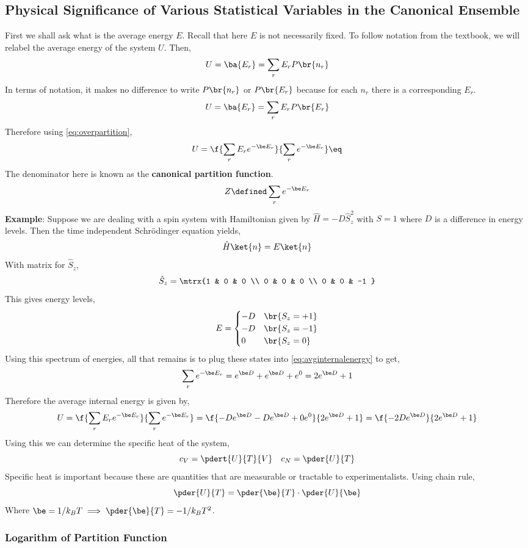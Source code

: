 \documentclass{article}
\begin{document}
\subsection{Physical Significance of Various Statistical Variables in the Canonical Ensemble}
First we shall ask what is the average energy $E$. Recall that here $E$ is not necessarily fixed. To follow notation from the textbook, we will relabel the average energy of the system $U$. Then,
\[ U = \ba{E_r} = \sum_r E_r P\br{n_r} \]
In terms of notation, it makes no difference to write $P\br{n_r}$ or $P\br{E_r}$ because for each $n_r$ there is a corresponding $E_r$.
\[ U = \ba{E_r} = \sum_r E_r P\br{E_r} \]
Therefore using \eqref{eq:overpartition},
\[ U = \f{\sum_r E_r e^{-\be E_r}}{\sum_r e^{-\be E_r}} \eq \label{eq:avginternalenergy} \]
The denominator here is known as the \textbf{canonical partition function}.
\[ Z \defined \sum_r e^{-\be E_r} \]
\textbf{Example}: Suppose we are dealing with a spin system with Hamiltonian given by $\hat{H} = - D \hat{S}_z^2$ with $S = 1$ where $D$ is a difference in energy levels. Then the time independent Schrödinger equation yields,
\[ \hat{H} \ket{n} = E \ket{n} \]
With matrix for $\hat{S}_z$,
\[ \hat{S}_z = \mtrx{1 & 0 & 0 \\ 0 & 0 & 0  \\ 0 & 0 & -1 } \]
This gives energy levels,
\[ E = \begin{cases}
    -D & \br{S_z = + 1} \\
    -D & \br{S_z = - 1} \\
    0 & \br{S_z = 0} \\
\end{cases} \]
Using this spectrum of energies, all that remains is to plug these states into \eqref{eq:avginternalenergy} to get,
\[ \sum_r e^{-\be E_r} = e^{\be D} + e^{\be D} + e^{0} = 2e^{\be D} + 1 \]
Therefore the average internal energy is given by,
\[ U = \f{\sum_r E_r e^{-\be E_r}}{\sum_r e^{-\be E_r}} = \f{-De^{\be D} - De^{\be D} + 0e^{0}}{2e^{\be D} + 1} = \f{-2De^{\be D}}{2e^{\be D} + 1}\]
Using this we can determine the specific heat of the system,
\[ c_V = \pdert{U}{T}{V} \quad c_N = \pder{U}{T} \]
Specific heat is important because these are quantities that are measurable or tractable to experimentalists. Using chain rule,
\[ \pder{U}{T} = \pder{\be}{T} \cdot \pder{U}{\be} \]
Where $\be = 1/k_B T \implies \pder{\be}{T} = - 1 / k_B T^2$.

\subsubsection{Logarithm of Partition Function}
\end{document}
